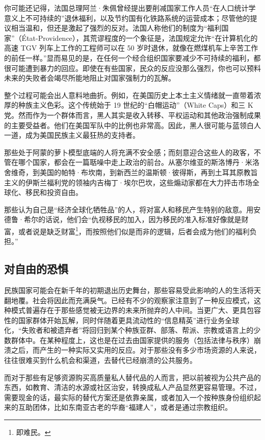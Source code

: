 你可能还记得，法国总理阿兰·朱佩曾经提出要削减国家工作人员“在人口统计学意义上不可持续的”退休福利，以及节约国有化铁路系统的运营成本；尽管他的提议相当温和，但还是激起了强烈的反对。法国人称他们的制度为“福利国家”（État-Providence），其荒谬程度的一个象征是，法国规定允许“在计算机化的高速 TGV 列车上工作的工程师可以在 50 岁时退休，就像在燃煤机车上辛苦工作的前任一样。”显而易见的是，在任何一个经合组织国家要减少不可持续的福利，都很可能遭到暴力的回应。即使在有些国家，民众的反应没那么强烈，你也可以预料未来的失败者会竭尽所能地阻止对国家强制力的瓦解。

整个过程可能会出人意料地曲折。例如，在美国历史上本土主义情绪就一直带着浓厚的种族主义色彩。这个传统始于 19 世纪的“白帽运动”（White Caps）和三 K 党。然而作为一个群体而言，黑人其实是收入转移、平权运动和其他政治强制成果的主要受益者。他们在美国军队中的比例也非常高。因此，黑人很可能与蓝领白人一道，成为美国民族主义最狂热的支持者。

那些处于阿蒙的萝卜模型底端的人将充满不安全感；而刻意迎合这些人的政客，不管在哪个国家，都会在一篇聒噪中走上政治的前台。从塞尔维亚的斯洛博丹·米洛舍维奇，到美国的帕特·布坎南，到新西兰的温斯顿·彼得斯，再到土耳其原教旨主义的伊斯兰福利党的领袖内吉梅丁·埃尔巴坎，这些煽动家都在大力抨击市场全球化、移民和投资自由。

那些认为自己是“经济全球化牺牲品”的人，将对富人和移民产生特别的敌意。用安德鲁·希尔的话说，他们会“仇视移民的加入，因为移民的准入标准好像就是财富，或者说是缺乏财富\footnote{即难民。}，而按照他们似是而非的逻辑，后者会成为他们的福利负担。”

\subsection{对自由的恐惧}
民族国家可能会在新千年的初期退出历史舞台，那些容易受此影响的人的生活将天翻地覆。社会将因此而充满戾气。已经有不少的观察家注意到了一种反应模式，这种模式普遍存在于那些感觉被无边界的未来所抛弃的人中间。当更广大、更具包容性的国家群体开始瓦解，同时伴随着更具流动性的“信息精英”进行业务全球化，“失败者和被遗弃者”将回归到某个种族亚群、部落、帮派、宗教或语言上的少数群体中。在某种程度上，这也是在过去由国家提供的服务（包括法律与秩序）崩溃之后，而产生的一种实际又实用的反应。对于那些没有多少市场资源的人来说，往往很难买到什么机会和渠道，去替代已经崩溃的公共服务。

而对于那些有足够资源购买高质量私人替代品的人而言，把以前被视为公共产品的东西，如教育、清洁的水源或社区治安，转换成私人产品显然更容易管理。不过，需要现金的话，最实际的替代方案还是依靠亲属，或者加入一个按种族身份组织起来的互助团体，比如东南亚古老的华裔“福建人”，或者是通过宗教组织。

